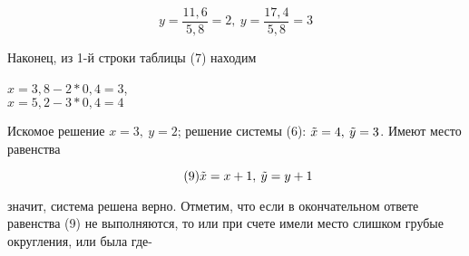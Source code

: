 \[y = \frac{11,6}{5,8} = 2,\:y = \frac{17,4}{5,8} = 3\]

\noindent Наконец, из 1-й строки таблицы (7) находим
\begin{center}
$x=3,8 - 2 * 0,4 = 3$,\\
$x=5,2 - 3 * 0,4 = 4$
\end{center}
\par Искомое решение $x=3,\:y=2$; решение системы (6): $\Tilde{x}=4,\:\Tilde{y}=3$. Имеют место равенства

\begin{equation} \tag{9}
    \Tilde{x}=x+1,\:\Tilde{y}=y+1
\end{equation}

\noindent значит, система решена верно. Отметим, что если в окончательном ответе равенства (9) не выполняются, то или при счете имели место слишком грубые округления, или была где-